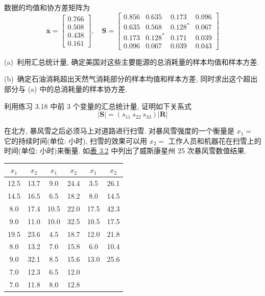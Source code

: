 数据的均值和协方差矩阵为
\[
\bar{\mathbf{x}}=\begin{bmatrix}
0.766\\
0.508\\
0.438\\
0.161
\end{bmatrix},
\quad
\mathbf{S}=\begin{bmatrix}
0.856&0.635&0.173&0.096\\
0.635&0.568&0.128^{*}&0.067\\
0.173&0.128^{*}&0.171&0.039\\
0.096&0.067&0.039&0.043
\end{bmatrix}
\]

(a)\ 利用汇总统计量, 确定美国对这些主要能源的总消耗量的样本均值和样本方差.

(b)\ 确定石油消耗超出天然气消耗部分的样本均值和样本方差, 同时求出这个超出部分与 (a) 中的总消耗量的样本协方差.

\quad 利用练习 3.18 中前 3 个变量的汇总统计量, 证明如下关系式
\[
|\mathbf{S}|=(s_{11}\ s_{22}\ s_{33})|\mathbf{R}|
\]

\quad 在北方, 暴风雪之后必须马上对道路进行扫雪. 对暴风雪强度的一个衡量是 $x_1=$ 它的持续时间(单位: 小时), 扫雪的效果可以用 $x_2=$ 工作人员和机器花在扫雪上的时间(单位: 小时)来衡量. 如\hyperref[tab:3.2]{表 3.2} 中列出了威斯康星州 25 次暴风雪数值结果.

\begin{mvtable}
\label{tab:3.2}
\begin{tabular}{cc@{\hspace{2em}}cc@{\hspace{2em}}cc}
\toprule
$x_1$&$x_2$&$x_1$&$x_2$&$x_1$&$x_2$\\
\midrule
12.5&13.7&9.0&24.4&3.5&26.1\\
14.5&16.5&6.5&18.2&8.0&14.5\\
8.0&17.4&10.5&22.0&17.5&42.3\\
9.0&11.0&10.0&32.5&10.5&17.5\\
19.5&23.6&4.5&18.7&12.0&21.8\\
8.0&13.2&7.0&15.8&6.0&10.4\\
9.0&32.1&8.5&15.6&13.0&25.6\\
7.0&12.3&6.5&12.0&&\\
7.0&11.8&8.0&12.8&&\\
\bottomrule
\end{tabular}
\end{mvtable}

